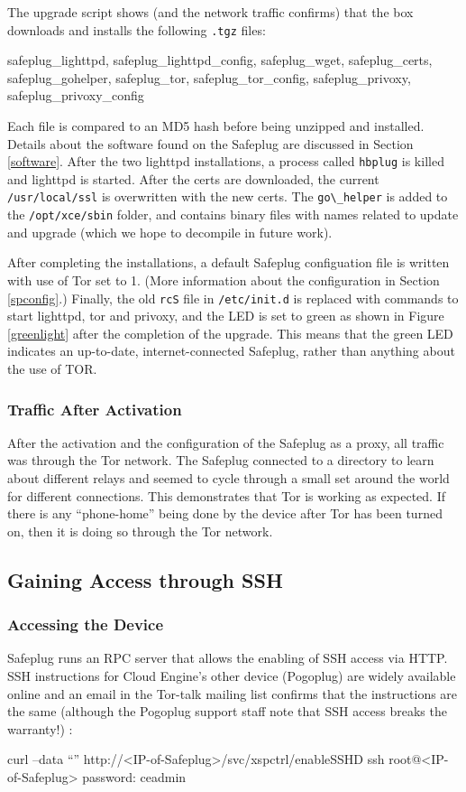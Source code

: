 The upgrade script shows (and the network traffic confirms) that the box downloads and installs the following \verb!.tgz! files: 
\begin{fileName}
safeplug_lighttpd, safeplug_lighttpd_config, safeplug_wget, safeplug_certs, safeplug_gohelper, safeplug_tor, safeplug_tor_config, safeplug_privoxy, safeplug_privoxy_config
\end{fileName}
  Each file is compared to an MD5 hash before being unzipped and installed.  Details about the software found on the Safeplug are discussed in Section \ref{software}.  After the two lighttpd installations, a process called \verb!hbplug! is killed and lighttpd is started.  After the certs are downloaded, the current \verb!/usr/local/ssl! is overwritten with the new certs.  The \verb!go\_helper! is added to the \verb!/opt/xce/sbin! folder, and contains binary files with names related to update and upgrade (which we hope to decompile in future work).

After completing the installations, a default Safeplug configuation file is written with use of Tor set to 1.  (More information about the configuration in Section \ref{spconfig}.)  Finally, the old \verb!rcS! file in \verb!/etc/init.d! is replaced with commands to start lighttpd, tor and privoxy, and the LED is set to green as shown in Figure \ref{greenlight} after the completion of the upgrade. This means that the green LED indicates an up-to-date, internet-connected Safeplug, rather than anything about the use of TOR.

\subsubsection{Traffic After Activation}
After the activation and the configuration of the Safeplug as a proxy, all traffic was through the Tor network.  The Safeplug connected to a directory to learn about different relays and seemed to cycle through a small set around the world for different connections.  This demonstrates that Tor is working as expected.  If there is any ``phone-home'' being done by the device after Tor has been turned on, then it is doing so through the Tor network.


\subsection{Gaining Access through SSH}
\label{sec:SSH}
    \subsubsection{Accessing the Device}
    Safeplug runs an RPC server that allows the enabling of SSH access via HTTP. SSH instructions for Cloud Engine's other device (Pogoplug) are widely available online and an email in the Tor-talk mailing list confirms that the instructions are the same (although the Pogoplug support staff note that SSH access breaks the warranty!) \cite{ceadmin}:
\begin{fileName}
curl --data ``'' http://<IP-of-Safeplug>/svc/xspctrl/enableSSHD
ssh root@<IP-of-Safeplug>
password: ceadmin
\end{fileName}


